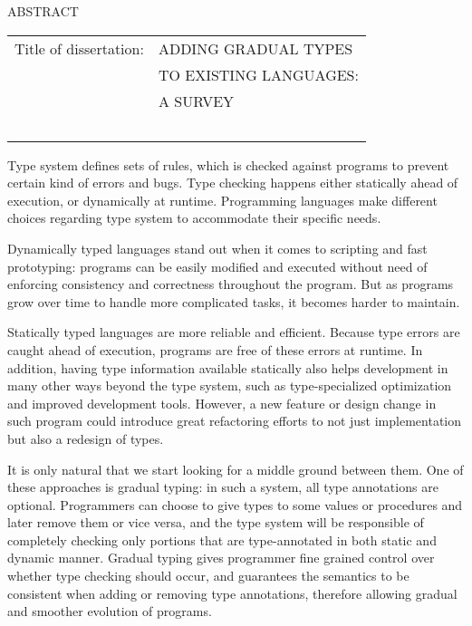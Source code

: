 \renewcommand{\baselinestretch}{1}
\small \normalsize

\begin{center}
\large{{ABSTRACT}}

\vspace{3em}

\end{center}
\hspace{-.15in}


\vspace{3em}
\begin{tabular}{ll}
	Title of dissertation:    & {\large  ADDING GRADUAL TYPES }\\
	&                     {\large  TO EXISTING LANGUAGES:} \\
	&                     {\large  A SURVEY} \\
	\ \\
\end{tabular}

\renewcommand{\baselinestretch}{2}
\large \normalsize



Type system defines sets of rules, which is checked against programs to
prevent certain kind of errors and bugs. Type checking happens either
statically ahead of execution, or dynamically at runtime.
Programming languages make different choices regarding type system to
accommodate their specific needs.

Dynamically typed languages stand out when it comes to scripting and fast prototyping:
programs can be easily modified and executed without need of enforcing consistency and correctness throughout the program.
But as programs grow over time to handle more complicated tasks,
it becomes harder to maintain.

Statically typed languages are more reliable and efficient.
Because type errors are caught ahead of execution,
programs are free of these errors at runtime.
In addition, having type information available statically also helps
development in many other ways beyond the type system, such as
type-specialized optimization and improved development tools.
However, a new feature or design change in such program could introduce
great refactoring efforts to not just implementation but also a redesign
of types.

It is only natural that we start looking for a middle ground between them.
One of these approaches is gradual typing: in such a system,
all type annotations are optional.
Programmers can choose to give types to some values or procedures and later remove them or vice versa, and the type system will be responsible of completely checking only portions
that are type-annotated in both static and dynamic manner.
Gradual typing gives programmer fine grained control over whether type checking should occur,
and guarantees the semantics to be consistent when adding or removing type annotations,
therefore allowing gradual and smoother evolution of programs.

